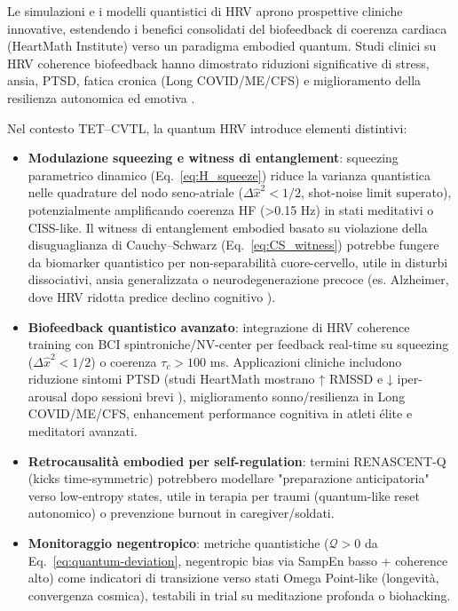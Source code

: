 \documentclass[11pt,a4paper]{article}
\let\oldcite\cite
\renewcommand{\cite}{\protect\oldcite}
\theoremstyle{plain}
\theoremstyle{definition}
\begin{document}
Le simulazioni e i modelli quantistici di HRV aprono prospettive cliniche innovative, estendendo i benefici consolidati del biofeedback di coerenza cardiaca (HeartMath Institute) verso un paradigma embodied quantum. Studi clinici su HRV coherence biofeedback hanno dimostrato riduzioni significative di stress, ansia, PTSD, fatica cronica (Long COVID/ME/CFS) e miglioramento della resilienza autonomica ed emotiva \cite{McCraty2017, McCraty2022, Shaffer2017, Lehrer2020}.

Nel contesto TET–CVTL, la quantum HRV introduce elementi distintivi:

\begin{itemize}
    \item \textbf{Modulazione squeezing e witness di entanglement}: squeezing parametrico dinamico (Eq.~\eqref{eq:H_squeeze}) riduce la varianza quantistica nelle quadrature del nodo seno-atriale ($\Delta \hat{x}^2 < 1/2$, shot-noise limit superato), potenzialmente amplificando coerenza HF (>0.15 Hz) in stati meditativi o CISS-like. Il witness di entanglement embodied basato su violazione della disuguaglianza di Cauchy–Schwarz (Eq.~\eqref{eq:CS_witness}) potrebbe fungere da biomarker quantistico per non-separabilità cuore-cervello, utile in disturbi dissociativi, ansia generalizzata o neurodegenerazione precoce (es. Alzheimer, dove HRV ridotta predice declino cognitivo \cite{Thayer2009, Kemp2010}).

    \item \textbf{Biofeedback quantistico avanzato}: integrazione di HRV coherence training con BCI spintroniche/NV-center per feedback real-time su squeezing ($\Delta \hat{x}^2 < 1/2$) o coerenza $\tau_c > 100$ ms. Applicazioni cliniche includono riduzione sintomi PTSD (studi HeartMath mostrano ↑ RMSSD e ↓ iper-arousal dopo sessioni brevi \cite{McCraty2022}), miglioramento sonno/resilienza in Long COVID/ME/CFS, enhancement performance cognitiva in atleti élite e meditatori avanzati.

    \item \textbf{Retrocausalità embodied per self-regulation}: termini RENASCENT-Q (kicks time-symmetric) potrebbero modellare "preparazione anticipatoria" verso low-entropy states, utile in terapia per traumi (quantum-like reset autonomico) o prevenzione burnout in caregiver/soldati.

    \item \textbf{Monitoraggio negentropico}: metriche quantistiche ($\mathcal{Q} > 0$ da Eq.~\eqref{eq:quantum-deviation}, negentropic bias via SampEn basso + coherence alto) come indicatori di transizione verso stati Omega Point-like (longevità, convergenza cosmica), testabili in trial su meditazione profonda o biohacking.
\end{itemize}
\end{document}
